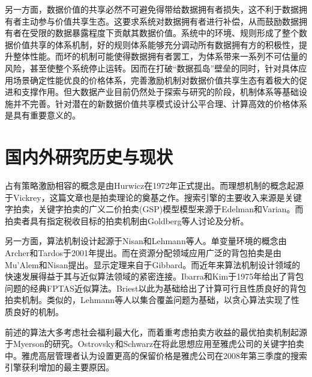 \documentclass[promaster]{thesis-uestc}
\begin{document}

另一方面，数据价值的共享必然不可避免得带给数据拥有者损失，这不利于数据拥有者主动参与价值共享生态。这要求系统对数据拥有者进行补偿，从而鼓励数据拥有者在受限的数据暴露程度下贡献其数据价值。系统中的环境、规则形成了整个数据价值共享的体系机制，好的规则体系能够充分调动所有数据拥有方的积极性，提升整体性能。而坏的机制可能使得数据拥有者罢工，为体系带来一系列不可估量的风险，甚至使整个系统停止运转。因而在打破“数据孤岛”壁垒的同时，针对具体应用场景确定性能优良的价格体系，完善激励机制对数据价值共享生态有着极大的促进和支撑作用。但大数据产业目前仍然处于探索与研究的阶段，机制体系等基础设施并不完善。针对潜在的新数据价值共享模式设计公平合理、计算高效的价格体系是具有重要意义的。


\section{国内外研究历史与现状}

占有策略激励相容的概念是由Hurwicz在1972年正式提出。而理想机制的概念起源于Vickrey，这篇文章也是拍卖理论的奠基之作。搜索引擎的主要收入来源是关键字拍卖，关键字拍卖的广义二价拍卖(GSP)模型模型来源于Edelman和Varian。而拍卖者具有指定税收目标的拍卖机制由Goldberg等人讨论及分析。

另一方面，算法机制设计起源于Nisan和Lehmann等人。单变量环境的概念由Archer和Tardos于2001年提出。而在资源分配领域应用广泛的背包拍卖是由Mu'Alem和Nisan提出。显示定理来自于Gibbard。而近年来算法机制设计领域的快速发展得益于其与近似算法领域的紧密连接。Ibarra和Kim于1975年给出了背包问题的经典FPTAS近似算法。Briest以此为基础给出了计算可行且性质良好的背包拍卖机制。类似的，Lehmann等人以集合覆盖问题为基础，以贪心算法实现了性质良好的机制。

前述的算法大多考虑社会福利最大化，而着重考虑拍卖方收益的最优拍卖机制起源于Myerson的研究。Ostrovsky和Schwarz在将此思想应用至雅虎公司的关键字拍卖中。雅虎高层管理者认为设置更高的保留价格是雅虎公司在2008年第三季度的搜索引擎获利增加的最主要原因。
\end{document}
